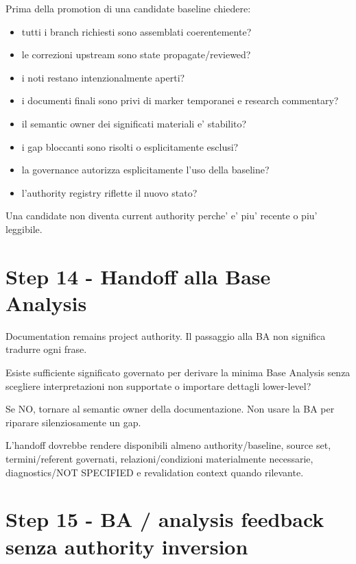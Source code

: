 \documentclass[11pt,a4paper]{article}
\begin{document}
Prima della promotion di una candidate baseline chiedere:
\begin{itemize}
  \item tutti i branch richiesti sono assemblati coerentemente?
  \item le correzioni upstream sono state propagate/reviewed?
  \item i \NS{} noti restano intenzionalmente aperti?
  \item i documenti finali sono privi di marker temporanei e research commentary?
  \item il semantic owner dei significati materiali e' stabilito?
  \item i gap bloccanti sono risolti o esplicitamente esclusi?
  \item la governance autorizza esplicitamente l'uso della baseline?
  \item l'authority registry riflette il nuovo stato?
\end{itemize}

Una candidate non diventa current authority perche' e' piu' recente o piu' leggibile.

\section{Step 14 - Handoff alla Base Analysis}
\closedtag

Documentation remains project authority. Il passaggio alla BA non significa tradurre ogni frase.

\begin{ddtacheck}[title={Handoff question}]
Esiste sufficiente significato governato per derivare la minima Base Analysis senza scegliere interpretazioni non supportate o importare dettagli lower-level?
\end{ddtacheck}

Se NO, tornare al semantic owner della documentazione. Non usare la BA per riparare silenziosamente un gap.

L'handoff dovrebbe rendere disponibili almeno authority/baseline, source set, termini/referent governati, relazioni/condizioni materialmente necessarie, diagnostics/NOT SPECIFIED e revalidation context quando rilevante.

\section{Step 15 - BA / analysis feedback senza authority inversion}
\closedtag
\end{document}
